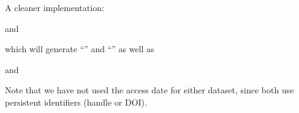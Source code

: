 \documentclass[AEJ]{AEA}
\newcommand{\citet}{\textcite}
\begin{document}
A cleaner implementation: 

and

which will generate ``\citet{duflopande2006-new}'' and ``\citet{leiss1999-new}'' as well as
%
\begin{quote}
\end{quote}
%
and
%
\begin{quote}
\end{quote}
%
Note that we have not used the access date for either dataset, since both use persistent identifiers (handle or DOI).

\newpage
%
%

\printbibliography[title={References}]
\end{document}
